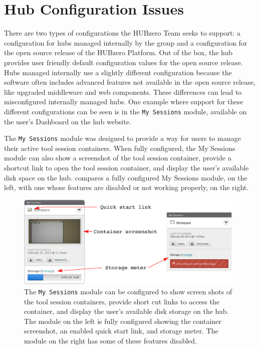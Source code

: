 \section{Hub Configuration Issues}
\label{sec:problem_config}

There are two types of configurations the HUBzero Team seeks to
support: a configuration for hubs managed internally by the group and a
configuration for the open source release of the HUBzero Platform. Out of the
box, the hub provides user friendly default configuration values for the open
source release. Hubs managed internally use a slightly different configuration
because the software often includes advanced features not available in the open
source release, like upgraded middleware and web components. These differences
can lead to misconfigured internally managed hubs. One example where support
for these different configurations can be seen is in the \texttt{My Sessions}
module, available on the user's Dashboard on the hub website.

The \texttt{My Sessions} module was designed to provide a way for users to
manage their active tool session containers. When fully configured, the My
Sessions module can also show a screenshot of the tool session container,
provide a shortcut link to open the tool session container, and display the
user's available disk space on the hub.
 compares a fully configured My Sessions
module, on the left, with one whose features are disabled or not working
properly, on the right.

\begin{figure}[H]
  \centering
  \includegraphics[width=0.98\textwidth]
    {../../images/eps/hub+configuration+dashboard+my+sessions+2.pdf}
  \caption{ The \texttt{My Sessions} module can be configured to show
            screen shots of the tool session containers, provide short
            cut links to access the container, and display the user's
            available disk storage on the hub. The module on the left
            is fully configured showing the container screenshot, an
            enabled quick start link, and storage meter. The module
            on the right has some of these features disabled.}
  \label{fig:my_sessions_module_compare}
\end{figure}


